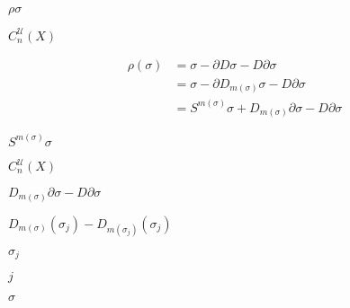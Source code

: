 \documentclass[10pt]{book}
\begin{document}
\begin{mdSnippets}
\begin{mdInlineSnippet}[87679b49dfdb1a04272b3c20d8732f6a]%
$\rho\sigma$\end{mdInlineSnippet}%
\begin{mdInlineSnippet}%
$C_n^\mathcal{U}(X)$\end{mdInlineSnippet}%
\begin{mdDisplaySnippet}[c2c850a9af4b7dd4bd88435c93368ca2]%
\[%
\begin{aligned}
\rho(\sigma) &= \sigma - \partial D \sigma - D \partial \sigma \\
&= \sigma - \partial D_{m(\sigma)} \sigma - D \partial \sigma \\
&= S^{m(\sigma)} \sigma  + D_{m(\sigma)} \partial \sigma - D \partial \sigma
\end{aligned}
\]%
\end{mdDisplaySnippet}%
\begin{mdInlineSnippet}[f6cfbac76f1213200e20b2740ca9e172]%
$S^{m(\sigma)} \sigma$\end{mdInlineSnippet}%
\begin{mdInlineSnippet}%
$C_n^\mathcal{U}(X)$\end{mdInlineSnippet}%
\begin{mdInlineSnippet}[42cb7a1840727ee59a35604a581f88ed]%
$D_{m(\sigma)} \partial \sigma - D \partial \sigma$\end{mdInlineSnippet}%
\begin{mdInlineSnippet}[b4398a4393c1f7aa762bfad075bc5074]%
$D_{m(\sigma)} (\sigma_j) - D_{m(\sigma_j)} (\sigma_j)$\end{mdInlineSnippet}%
\begin{mdInlineSnippet}%
$\sigma_j$\end{mdInlineSnippet}%
\begin{mdInlineSnippet}[363b122c528f54df4a0446b6bab05515]%
$j$\end{mdInlineSnippet}%
\begin{mdInlineSnippet}[a2ab7d71a0f07f388ff823293c147d21]%
$\sigma$\end{mdInlineSnippet}%
\begin{mdInlineSnippet}[5e4d2193f27963b5f6f9599bc4676aa5]%

\end{mdInlineSnippet}
\end{mdSnippets}
\end{document}
